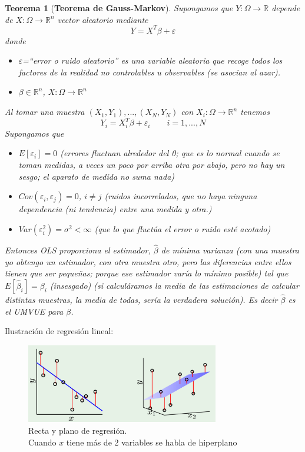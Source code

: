 \documentclass[11pt,a4paper]{article}
\newtheorem{theorem}{Teorema}
\theoremstyle{definition}
\newcommand{\R}{\mathbb{R}}
\begin{document}
	\begin{theorem}[\textbf{Teorema de Gauss-Markov}]
	Supongamos que $Y\colon \Omega \to \R$ depende de $X\colon \Omega \to \R^n$ vector aleatorio mediante
	$$Y=X^T \beta + \varepsilon$$
	donde 
	\begin{itemize}
	\item $\varepsilon$=``error o ruido aleatorio'' es una variable aleatoria que recoge todos los factores de la realidad no controlables u observables (se asocian al azar).
	\item $\beta \in \R^n$, $X\colon \Omega \to \R^n$
	\end{itemize}
	Al tomar una muestra $(X_1,Y_1),...,(X_N,Y_N)$ con $X_i\colon \Omega \to \R^n$ tenemos
	$$Y_i=X_i^T \beta + \varepsilon_i \quad \quad i=1,...,N$$
	Supongamos que
	\begin{itemize}
		\item $E[\varepsilon_i]=0$ (errores fluctuan alrededor del 0; que es lo normal cuando se toman medidas, a veces un poco por arriba otra por abajo, pero no hay un sesgo; el aparato de medida no suma nada)
		\item $Cov(\varepsilon_i,\varepsilon_j)=0$, $i\neq j$ (ruidos incorrelados, que no haya ninguna dependencia (ni tendencia) entre una medida y otra.)
		\item $Var(\varepsilon_i^2)=\sigma^2 < \infty$ (que lo que fluctúa el error o ruido esté acotado)
	\end{itemize}
	Entonces \textit{OLS} proporciona el estimador, $\hat \beta$ de mínima varianza (con una muestra yo obtengo un estimador, con otra muestra otro, pero las diferencias entre ellos tienen que ser pequeñas; porque ese estimador varía lo mínimo posible) tal que $E[\hat \beta_i]=\beta_i$ (insesgado) (si calculáramos la media de las estimaciones de calcular distintas muestras, la media de todas, sería la verdadera solución). Es decir $\hat \beta$ es el UMVUE para $\beta$.
	\end{theorem}
	
	Ilustración de regresión lineal:
	\begin{figure}[h!]
	\centering
	\includegraphics[width=0.75\textwidth]{images/recta_y_plano}
	\caption{Recta y plano de regresión.\\ Cuando $x$ tiene más de 2 variables se habla de hiperplano}
	\end{figure}
	
\end{document}
